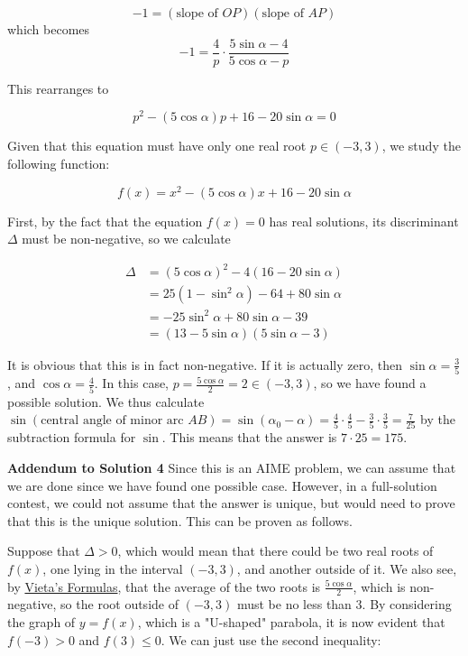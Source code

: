 \begin{enumerate}
 
 \[-1 = \left(\text{slope of } OP\right)\left(\text{slope of } AP\right)\]which becomes
 \[-1 = \frac{4}{p} \cdot \frac{5\sin \alpha - 4}{5\cos \alpha - p}\]

 This rearranges to

 
 \[p^2 - (5\cos \alpha)p + 16 - 20 \sin \alpha = 0\]

 Given that this equation must have only one real root $p\in (-3,3)$, we study the following function:

 
 \[f(x) =  x^2 - (5\cos \alpha)x + 16 - 20 \sin \alpha\]

 First, by the fact that the equation $f(x)=0$ has real solutions, its discriminant $\Delta$ must be non-negative, so we calculate

 
 \[\begin{split}\Delta & = (5\cos \alpha)^2 - 4(16-20\sin \alpha) \\ & =  25 (1- \sin^2 \alpha)  - 64 + 80 \sin \alpha \\ & = -25 \sin^2 \alpha + 80\sin \alpha - 39 \\ & =  (13 - 5\sin \alpha)(5\sin \alpha - 3)\end{split}\]

 It is obvious that this is in fact non-negative. If it is actually zero, then $\sin \alpha = \frac{3}{5}$, and $\cos \alpha = \frac{4}{5}$. In this case, $p = \frac{5\cos \alpha}{2} = 2 \in (-3,3)$, so we have found a possible solution. We thus calculate $\sin(\text{central angle of minor arc } AB) = \sin (\alpha_0 - \alpha) = \frac{4}{5}\cdot \frac{4}{5} - \frac{3}{5} \cdot \frac{3}{5} = \frac{7}{25}$ by the subtraction formula for $\sin$. This means that the answer is $7 \cdot 25 = 175$.

 \textbf{Addendum to Solution 4} Since this is an AIME problem, we can assume that we are done since we have found one possible case. However, in a full-solution contest, we could not assume that the answer is unique, but would need to prove that this is the unique solution. This can be proven as follows.

 Suppose that $\Delta > 0$, which would mean that there could be two real roots of $f(x)$, one lying in the interval $(-3,3)$, and another outside of it. We also see, by \href{https://artofproblemsolving.com/wiki/index.php?title=Vieta\%27s\_Formulas}{Vieta's Formulas}, that the average of the two roots is $\frac{5\cos \alpha}{2}$, which is non-negative, so the root outside of $(-3,3)$ must be no less than $3$. By considering the graph of $y=f(x)$, which is a "U-shaped" parabola, it is now evident that $f(-3) > 0$ and $f(3)\leq 0$. We can just use the second inequality:


\end{enumerate}
